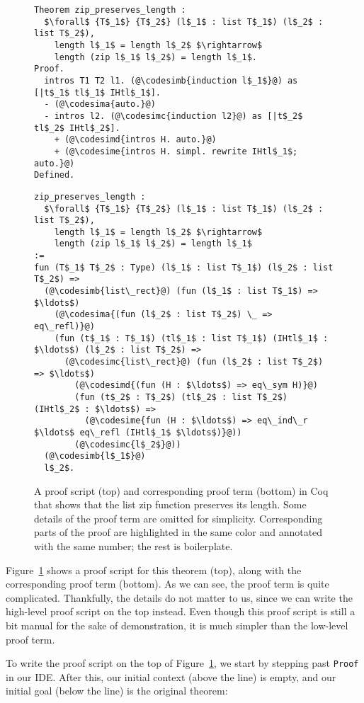 \begin{figure}
\begin{lstlisting}
Theorem zip_preserves_length :
  $\forall$ {T$_1$} {T$_2$} (l$_1$ : list T$_1$) (l$_2$ : list T$_2$),
    length l$_1$ = length l$_2$ $\rightarrow$
    length (zip l$_1$ l$_2$) = length l$_1$.
Proof.
  intros T1 T2 l1. (@\codesimb{induction l$_1$}@) as [|t$_1$ tl$_1$ IHtl$_1$].
  - (@\codesima{auto.}@)
  - intros l2. (@\codesimc{induction l2}@) as [|t$_2$ tl$_2$ IHtl$_2$].
    + (@\codesimd{intros H. auto.}@)
    + (@\codesime{intros H. simpl. rewrite IHtl$_1$; auto.}@)
Defined.
\end{lstlisting}
\begin{lstlisting}
zip_preserves_length :
  $\forall$ {T$_1$} {T$_2$} (l$_1$ : list T$_1$) (l$_2$ : list T$_2$),
    length l$_1$ = length l$_2$ $\rightarrow$
    length (zip l$_1$ l$_2$) = length l$_1$
:=
fun (T$_1$ T$_2$ : Type) (l$_1$ : list T$_1$) (l$_2$ : list T$_2$) =>
  (@\codesimb{list\_rect}@) (fun (l$_1$ : list T$_1$) => $\ldots$)
    (@\codesima{(fun (l$_2$ : list T$_2$) \_ => eq\_refl)}@)
    (fun (t$_1$ : T$_1$) (tl$_1$ : list T$_1$) (IHtl$_1$ : $\ldots$) (l$_2$ : list T$_2$) =>
      (@\codesimc{list\_rect}@) (fun (l$_2$ : list T$_2$) => $\ldots$)
        (@\codesimd{(fun (H : $\ldots$) => eq\_sym H)}@)
        (fun (t$_2$ : T$_2$) (tl$_2$ : list T$_2$) (IHtl$_2$ : $\ldots$) =>
          (@\codesime{fun (H : $\ldots$) => eq\_ind\_r $\ldots$ eq\_refl (IHtl$_1$ $\ldots$)}@))
        (@\codesimc{l$_2$}@))
  (@\codesimb{l$_1$}@)
  l$_2$.
\end{lstlisting}
\caption{A proof script (top) and corresponding proof term (bottom) in Coq that shows that the list zip function preserves its length.
Some details of the proof term are omitted for simplicity.
Corresponding parts of the proof are highlighted in the same color and annotated with the same number; the rest is boilerplate.}
\label{fig:zip-proof}
\end{figure}

Figure~\ref{fig:zip-proof} shows a proof script for this theorem (top), along with the corresponding proof term (bottom).
As we can see, the proof term is quite complicated.
Thankfully, the details do not matter to us, since we can write the high-level proof script on the top instead.
Even though this proof script is still a bit manual for the sake of demonstration,
it is much simpler than the low-level proof term.

To write the proof script on the top of Figure~\ref{fig:zip-proof}, we start by stepping past \lstinline{Proof} in our IDE.
After this, our initial context (above the line) is empty, and our initial goal (below the line) is the original theorem:

